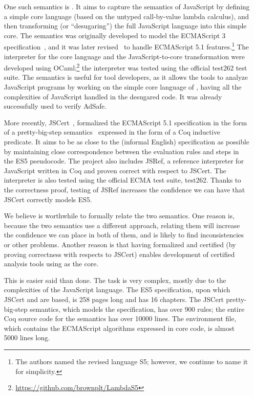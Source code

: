 \documentclass{llncs}
\newcommand{\as}[1]{\todo[color=green]{#1}}
\begin{document}
One such semantics is \lambdajs. It aims to capture
the semantics of JavaScript by defining a simple core language
(based on the untyped call-by-value lambda calculus), and then
transforming (or ``desugaring'') the full JavaScript language into this
simple core. The \lambdajs semantics was originally developed to model the 
ECMAScript 3 specification~\citep{Guha-al:ECOOP10}, and it was later
revised~\citep{Politz-al:DLS12} to handle ECMAScript 5.1
features.\footnote{The authors named the revised language S5; however,
we continue to name it \lambdajs for simplicity.}
The interpreter for the core language and the JavaScript-to-core
transformation were developed using 
OCaml;\footnote{\url{https://github.com/brownplt/LambdaS5}}
the interpreter was tested using the official test262 test suite.
The \lambdajs semantics is useful for tool developers, as it
allows the tools to analyze JavaScript programs by working
on the simple core language of \lambdajs, having all the complexities
of JavaScript handled in the desugared code. It was already
successfully used to verify AdSafe. \as{add citation}

More recently, JSCert~\citep{Bodin-al:POPL14},
formalized the ECMAScript 5.1 specification in the form of
a pretty-big-step semantics~\citep{Chargueraud:ESOP13} expressed in 
the form of a Coq inductive predicate. It aims to be as close to the
(informal English) specification as possible by maintaining close correspondence
between the evaluation rules and steps in the ES5 pseudocode. The project
also includes JSRef, a reference interpreter for JavaScript written in Coq
and proven correct with respect to JSCert. The interpreter is also tested
using the official ECMA test suite, test262. Thanks to the correctness proof,
testing of JSRef increases the confidence we can have that JSCert
correctly models ES5.

We believe is worthwhile to formally relate the two semantics. One reason is,
because the two semantics use a different approach, relating
them will increase the confidence we can place in both of them,
and is likely to find inconsistencies or other problems. Another reason is
that having \lambdajs formalized and certified (by proving correctness
with respects to JSCert) enables development of certified analysis tools
using \lambdajs as the core.

This is easier said than done. The task is very complex, mostly due
to the complexities of the JavaScript language. The ES5 specification,
upon which JSCert and \lambdajs are based, is 258 pages long and 
has 16 chapters. The JSCert pretty-big-step semantics, which models
the specification, has over 900 rules; the entire Coq source code
for the semantics has over 10000 lines. The \lambdajs environment
file, which contains the ECMAScript algorithms expressed in core
\lambdajs code, is almost 5000 lines long.
\end{document}
